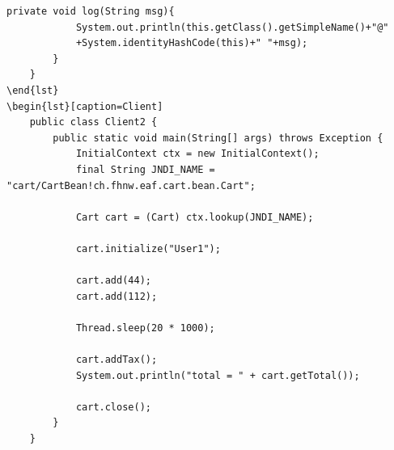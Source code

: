 \documentclass[a4paper,10pt]{scrreprt}
\begin{document}
\begin{lstlisting}[caption=Stateful Bean]
		private void log(String msg){
			System.out.println(this.getClass().getSimpleName()+"@"
			+System.identityHashCode(this)+" "+msg);
		}
	}
\end{lst}
\begin{lst}[caption=Client]
	public class Client2 {
		public static void main(String[] args) throws Exception {
			InitialContext ctx = new InitialContext();
			final String JNDI_NAME = "cart/CartBean!ch.fhnw.eaf.cart.bean.Cart";

			Cart cart = (Cart) ctx.lookup(JNDI_NAME);

			cart.initialize("User1");

			cart.add(44);
			cart.add(112);

			Thread.sleep(20 * 1000);

			cart.addTax();
			System.out.println("total = " + cart.getTotal());

			cart.close();
		}
	}
\end{lstlisting}
\end{document}
